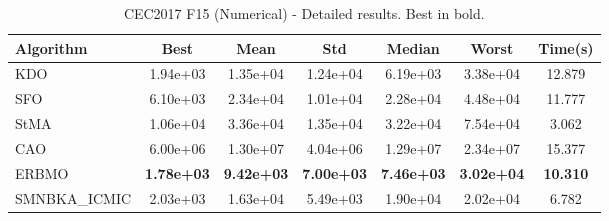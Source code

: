 \begin{table}[H]
\centering\small
\caption{CEC2017 F15 (Numerical) - Detailed results. Best in bold.}
\label{tab:cec2017_F15}
\begin{tabular}{lcccccc}
\toprule
\textbf{Algorithm} & \textbf{Best} & \textbf{Mean} & \textbf{Std} & \textbf{Median} & \textbf{Worst} & \textbf{Time(s)} \\
\midrule
KDO & 1.94e+03 & 1.35e+04 & 1.24e+04 & 6.19e+03 & 3.38e+04 & 12.879 \\
SFO & 6.10e+03 & 2.34e+04 & 1.01e+04 & 2.28e+04 & 4.48e+04 & 11.777 \\
StMA & 1.06e+04 & 3.36e+04 & 1.35e+04 & 3.22e+04 & 7.54e+04 & 3.062 \\
CAO & 6.00e+06 & 1.30e+07 & 4.04e+06 & 1.29e+07 & 2.34e+07 & 15.377 \\
ERBMO & \textbf{1.78e+03} & \textbf{9.42e+03} & \textbf{7.00e+03} & \textbf{7.46e+03} & \textbf{3.02e+04} & \textbf{10.310} \\
SMNBKA_ICMIC & 2.03e+03 & 1.63e+04 & 5.49e+03 & 1.90e+04 & 2.02e+04 & 6.782 \\
\bottomrule
\end{tabular}
\end{table}
